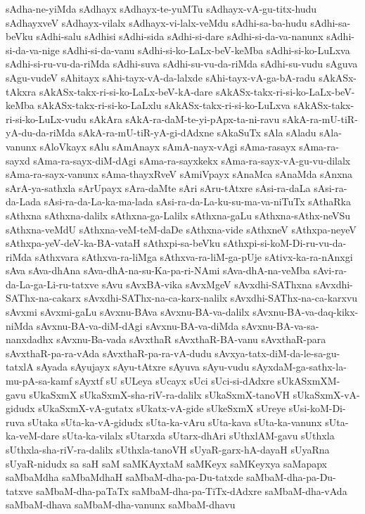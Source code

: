 {sAdha-ne-yiMda
sAdhayx
sAdhayx-te-yuMTu
sAdhayx-vA-gu-titx-hudu
sAdhayxveV
sAdhayx-vilalx
sAdhayx-vi-lalx-veMdu
sAdhi-sa-ba-hudu
sAdhi-sa-beVku
sAdhi-salu
sAdhisi
sAdhi-sida
sAdhi-si-dare
sAdhi-si-da-va-nanunx
sAdhi-si-da-va-nige
sAdhi-si-da-vanu
sAdhi-si-ko-LaLx-beV-keMba
sAdhi-si-ko-LuLxva
sAdhi-si-ru-vu-da-riMda
sAdhi-suva
sAdhi-su-vu-da-riMda
sAdhi-su-vudu
sAguva
sAgu-vudeV
sAhitayx
sAhi-tayx-vA-da-lalxde
sAhi-tayx-vA-ga-bA-radu
sAkASx-tAkxra
sAkASx-takx-ri-si-ko-LaLx-beV-kA-dare
sAkASx-takx-ri-si-ko-LaLx-beV-keMba
sAkASx-takx-ri-si-ko-LaLxlu
sAkASx-takx-ri-si-ko-LuLxva
sAkASx-takx-ri-si-ko-LuLx-vudu
sAkAra
sAkA-ra-daM-te-yi-pApx-ta-ni-ravu
sAkA-ra-mU-tiR-yA-du-da-riMda
sAkA-ra-mU-tiR-yA-gi-dAdxne
sAkaSuTx
sAla
sAladu
sAla-vanunx
sAloVkayx
sAlu
sAmAnayx
sAmA-nayx-vAgi
sAma-rasayx
sAma-ra-sayxd
sAma-ra-sayx-diM-dAgi
sAma-ra-sayxkekx
sAma-ra-sayx-vA-gu-vu-dilalx
sAma-ra-sayx-vanunx
sAma-thayxRveV
sAmiVpayx
sAnaMca
sAnaMda
sAnxna
sArA-ya-sathxla
sArUpayx
sAra-daMte
sAri
sAru-tAtxre
sAsi-ra-daLa
sAsi-ra-da-Lada
sAsi-ra-da-La-ka-ma-lada
sAsi-ra-da-La-ku-su-ma-va-niTuTx
sAthaRka
sAthxna
sAthxna-dalilx
sAthxna-ga-Lalilx
sAthxna-gaLu
sAthxna-sAthx-neVSu
sAthxna-veMdU
sAthxna-veM-teM-daDe
sAthxna-vide
sAthxneV
sAthxpa-neyeV
sAthxpa-yeV-deV-ka-BA-vataH
sAthxpi-sa-beVku
sAthxpi-si-koM-Di-ru-vu-da-riMda
sAthxvara
sAthxva-ra-liMga
sAthxva-ra-liM-ga-pUje
sAtivx-ka-ra-nAnxgi
sAva
sAva-dhAna
sAva-dhA-na-su-Ka-pa-ri-NAmi
sAva-dhA-na-veMba
sAvi-ra-da-La-ga-Li-ru-tatxve
sAvu
sAvxBA-vika
sAvxMgeV
sAvxdhi-SAThxna
sAvxdhi-SAThx-na-cakarx
sAvxdhi-SAThx-na-ca-karx-nalilx
sAvxdhi-SAThx-na-ca-karxvu
sAvxmi
sAvxmi-gaLu
sAvxnu-BAva
sAvxnu-BA-va-dalilx
sAvxnu-BA-va-daq-kikx-niMda
sAvxnu-BA-va-diM-dAgi
sAvxnu-BA-va-diMda
sAvxnu-BA-va-sa-nanxdadhx
sAvxnu-Ba-vada
sAvxthaR
sAvxthaR-BA-vanu
sAvxthaR-para
sAvxthaR-pa-ra-vAda
sAvxthaR-pa-ra-vA-dudu
sAvxya-tatx-diM-da-le-sa-gu-tatxlA
sAyada
sAyujayx
sAyu-tAtxre
sAyuva
sAyu-vudu
sAyxdaM-ga-sathx-la-mu-pA-sa-kamf
sAyxtf
sU
sULeya
sUcayx
sUci
sUci-si-dAdxre
sUkASxmXM-gavu
sUkaSxmX
sUkaSxmX-sha-riV-ra-dalilx
sUkaSxmX-tanoVH
sUkaSxmX-vA-gidudx
sUkaSxmX-vA-gutatx
sUkatx-vA-gide
sUkeSxmX
sUreye
sUsi-koM-Di-ruva
sUtaka
sUta-ka-vA-gidudx
sUta-ka-vAru
sUta-kava
sUta-ka-vanunx
sUta-ka-veM-dare
sUta-ka-vilalx
sUtarxda
sUtarx-dhAri
sUthxlAM-gavu
sUthxla
sUthxla-sha-riV-ra-dalilx
sUthxla-tanoVH
sUyaR-garx-hA-dayaH
sUyaRna
sUyaR-nidudx
sa
saH
saM
saMKAyxtaM
saMKeyx
saMKeyxya
saMapapx
saMbaMdha
saMbaMdhaH
saMbaM-dha-pa-Du-tatxde
saMbaM-dha-pa-Du-tatxve
saMbaM-dha-paTaTx
saMbaM-dha-pa-TiTx-dAdxre
saMbaM-dha-vAda
saMbaM-dhava
saMbaM-dha-vanunx
saMbaM-dhavu
}
